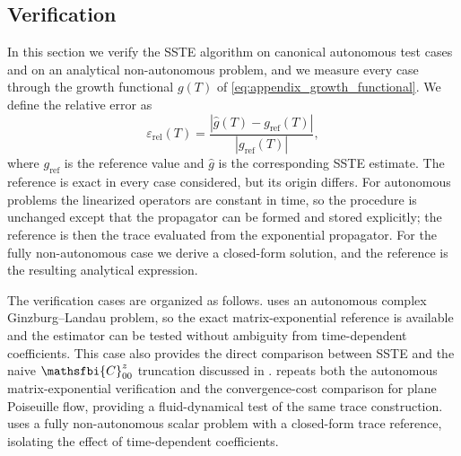\subsection{Verification}
\label{sec:appendix_verification}
In this section we verify the SSTE algorithm on canonical autonomous test cases and on an analytical non-autonomous problem, and we measure every case through the growth functional \(g(T)\) of \eqref{eq:appendix_growth_functional}. We define the relative error as
\begin{equation}
  \varepsilon_{\mathrm{rel}}(T)
  =
  \frac{
    \left|\widehat{g}(T)-g_{\mathrm{ref}}(T)\right|
  }{
    \left|g_{\mathrm{ref}}(T)\right|
  },
  \label{eq:verification_relative_error}
\end{equation}
where \(g_{\mathrm{ref}}\) is the reference value and \(\widehat{g}\) is the corresponding SSTE estimate. The reference is exact in every case considered, but its origin differs. For autonomous problems the linearized operators are constant in time, so the procedure is unchanged except that the propagator can be formed and stored explicitly; the reference is then the trace evaluated from the exponential propagator. For the fully non-autonomous case we derive a closed-form solution, and the reference is the resulting analytical expression.

The verification cases are organized as follows.  uses an autonomous complex Ginzburg--Landau problem, so the exact matrix-exponential reference is available and the estimator can be tested without ambiguity from time-dependent coefficients. This case also provides the direct comparison between SSTE and the naive \(\mathsfbi{C}_{00}^{z}\) truncation discussed in .  repeats both the autonomous matrix-exponential verification and the convergence-cost comparison for plane Poiseuille flow, providing a fluid-dynamical test of the same trace construction.  uses a fully non-autonomous scalar problem with a closed-form trace reference, isolating the effect of time-dependent coefficients.




